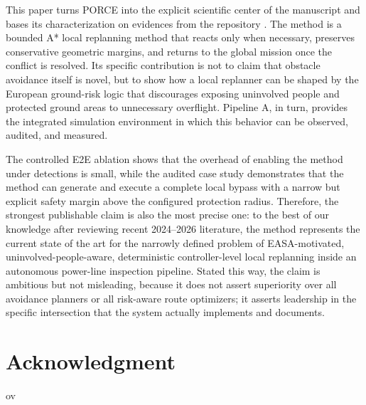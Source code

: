 \documentclass[journal,twoside,web]{ieeecolor}
\begin{document}
This paper turns PORCE into the explicit scientific center of the manuscript and bases its characterization on evidences from the repository \cite{Deep_Aero_Twin}. The method is a bounded A* local replanning method that reacts only when necessary, preserves conservative geometric margins, and returns to the global mission once the conflict is resolved. Its specific contribution is not to claim that obstacle avoidance itself is novel, but to show how a local replanner can be shaped by the European ground-risk logic that discourages exposing uninvolved people and protected ground areas to unnecessary overflight. Pipeline A, in turn, provides the integrated simulation environment in which this behavior can be observed, audited, and measured.

The controlled E2E ablation shows that the overhead of enabling the method under detections is small, while the audited case study demonstrates that the method can generate and execute a complete local bypass with a narrow but explicit safety margin above the configured protection radius. Therefore, the strongest publishable claim is also the most precise one: to the best of our knowledge after reviewing recent 2024--2026 literature, the method represents the current state of the art for the narrowly defined problem of EASA-motivated, uninvolved-people-aware, deterministic controller-level local replanning inside an autonomous power-line inspection pipeline. Stated this way, the claim is ambitious but not misleading, because it does not assert superiority over all avoidance planners or all risk-aware route optimizers; it asserts leadership in the specific intersection that the system actually implements and documents.


\section*{Acknowledgment}




ov
\end{document}

